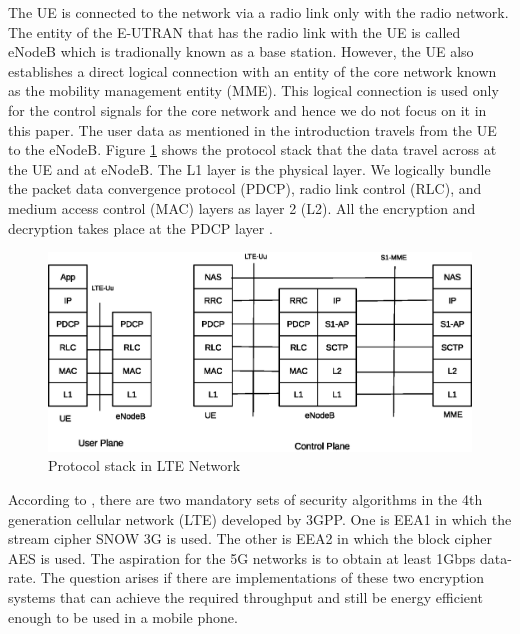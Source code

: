 \documentclass[lnicst,sechang,a4paper]{svmultln}
\begin{document}
The UE is connected to the network via a radio link only with the radio network. The entity of the E-UTRAN that has the radio link with the UE is called eNodeB which is tradionally known as a base station. However, the UE also establishes a direct logical connection with an entity of the core network known as the mobility management entity (MME). This logical connection is used only for the control signals for the core network and hence we do not focus on it in this paper. The user data as mentioned in the introduction travels from the UE to the eNodeB. Figure \ref{fig:protocl_stack} shows the protocol stack that the data travel across at the UE and at eNodeB. The L1 layer is the physical layer. We logically bundle the packet data convergence protocol (PDCP), radio link control (RLC), and medium access control (MAC) layers as layer 2 (L2). All the encryption and decryption takes place at the PDCP layer \cite{3GPP_TS_36_323}.

\begin{figure}
\begin{center}
  \includegraphics[width=.98\textwidth]{protocol_stack.eps}
\caption{Protocol stack in LTE Network}
\label{fig:protocl_stack}       %
\end{center}
\end{figure}

According to \cite{3GPP_TS_33_401}, there are two mandatory sets of security algorithms in the 4th generation cellular network (LTE) developed by 3GPP. One is EEA1 in which the stream cipher SNOW 3G is used. The other is EEA2 in which the block cipher AES is used. The aspiration for the 5G networks is to obtain at least 1Gbps data-rate. The question arises if there are implementations of these two encryption systems that can achieve the required throughput and still be energy efficient enough to be used in a mobile phone.
\end{document}
